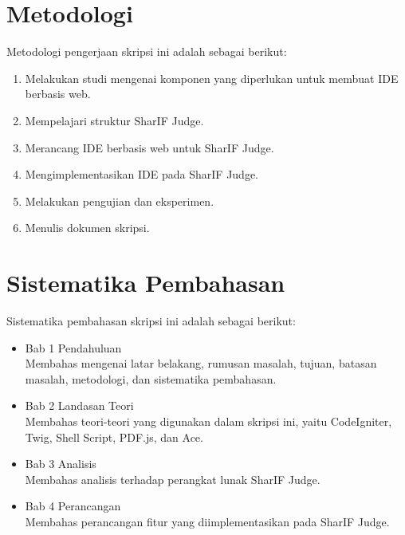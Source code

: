 \section{Metodologi}
\label{sec:metlit}
Metodologi pengerjaan skripsi ini adalah sebagai berikut:
\begin{enumerate}
	\item Melakukan studi mengenai komponen yang diperlukan untuk membuat IDE berbasis web.
	\item Mempelajari struktur SharIF Judge.
	\item Merancang IDE berbasis web untuk SharIF Judge.
	\item Mengimplementasikan IDE pada SharIF Judge.
	\item Melakukan pengujian dan eksperimen.
	\item Menulis dokumen skripsi.
\end{enumerate}

\section{Sistematika Pembahasan}
\label{sec:sispem}
Sistematika pembahasan skripsi ini adalah sebagai berikut:
\begin{itemize}
	\item Bab 1 Pendahuluan \\ Membahas mengenai latar belakang, rumusan masalah, tujuan, batasan masalah, metodologi, dan sistematika pembahasan.
	\item Bab 2 Landasan Teori \\ Membahas teori-teori yang digunakan dalam skripsi ini, yaitu CodeIgniter, Twig, Shell Script, PDF.js, dan Ace.
	\item Bab 3 Analisis \\ Membahas analisis terhadap perangkat lunak SharIF Judge.
	\item Bab 4 Perancangan \\ Membahas perancangan fitur yang diimplementasikan pada SharIF Judge.
\end{itemize}
